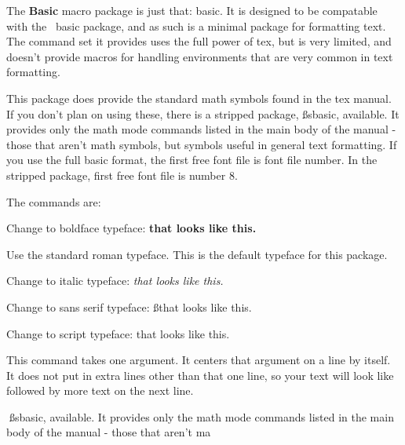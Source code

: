 
The {\bf Basic} macro package is just that: basic. It is designed
to be compatable with the \tex\ basic package, and as such is
a minimal package for formatting text. The command set it provides
uses the full power of tex, but is very limited, and doesn't
provide macros for handling environments that are very common in
text formatting.

This package does provide the standard math symbols found in the
tex manual. If you don't plan on using these, there is a stripped
package, {\ss sbasic,} available. It provides only the math mode commands
listed in the main body of the manual - those that aren't math
symbols, but symbols useful in general text formatting. If you
use the full basic format, the first free font file is font file
number. In the stripped package, first free font file is number 8.

The commands are:

{\describe

 Change to boldface typeface: {\bf that looks like this.}

 Use the standard roman typeface. This is the default
typeface for this package.

 Change to italic typeface: {\it that looks like this.}

 Change to sans serif typeface: {\ss that looks like this.}

 Change to script typeface: {\sc that looks like this.}

 This command takes one argument. It centers that
argument on a line by itself. It does not put in extra lines
other than that one line, so your text will look like
 followed by more text on the next line.
}	%


{\ss sbasic,} available. It provides only the math mode commands
listed in the main body of the manual - those that aren't ma